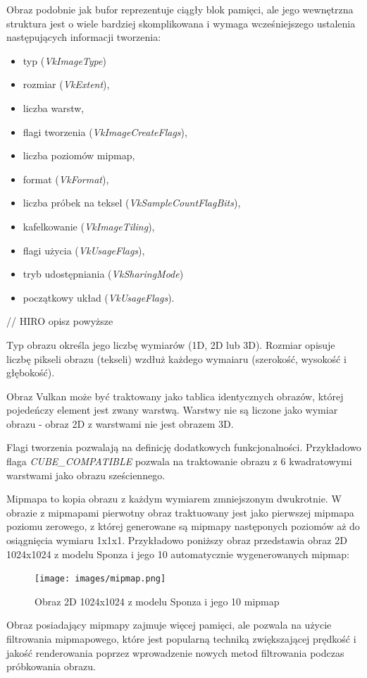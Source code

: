 Obraz podobnie jak bufor reprezentuje ciągły blok pamięci, ale jego wewnętrzna struktura jest o wiele bardziej skomplikowana i wymaga wcześniejszego ustalenia następujących informacji tworzenia:
\begin{itemize}
	\item typ (\textit{VkImageType})
	\item rozmiar (\textit{VkExtent}),
	\item liczba warstw,
	\item flagi tworzenia (\textit{VkImageCreateFlags}),
	\item liczba poziomów mipmap,
	\item format (\textit{VkFormat}),
	\item liczba próbek na teksel (\textit{VkSampleCountFlagBits}),
	\item kafelkowanie (\textit{VkImageTiling}),
	\item flagi użycia (\textit{VkUsageFlags}),
	\item tryb udostępniania (\textit{VkSharingMode})
	\item początkowy układ (\textit{VkUsageFlags}).
\end{itemize}

// HIRO opisz powyższe

Typ obrazu określa jego liczbę wymiarów (1D, 2D lub 3D).
Rozmiar opisuje liczbę pikseli obrazu (tekseli) wzdłuż każdego wymaiaru (szerokość, wysokość i głębokość).

Obraz Vulkan może być traktowany jako tablica identycznych obrazów, której pojedeńczy element jest zwany warstwą. Warstwy nie są liczone jako wymiar obrazu - obraz 2D z warstwami nie jest obrazem 3D.

Flagi tworzenia pozwalają na definicję dodatkowych funkcjonalności. Przykładowo flaga \textit{CUBE\_COMPATIBLE} pozwala na traktowanie obrazu z 6 kwadratowymi warstwami jako obrazu sześciennego.

Mipmapa to kopia obrazu z każdym wymiarem zmniejszonym dwukrotnie.
W obrazie z mipmapami pierwotny obraz traktuowany jest jako pierwszej mipmapa poziomu zerowego, z której generowane są mipmapy następonych poziomów aż do osiągnięcia wymiaru 1x1x1.
Przykładowo poniższy obraz przedstawia obraz 2D 1024x1024 z modelu Sponza \cite{GLTFSAMPLEMODELS} i jego 10 automatycznie wygenerowanych mipmap:
\begin{figure}[htbp]
	\centering
	\texttt{[image: images/mipmap.png]}
	\caption{Obraz 2D 1024x1024 z modelu Sponza \cite{GLTFSAMPLEMODELS} i jego 10 mipmap}
	\label{mipmap}
\end{figure}
Obraz posiadający mipmapy zajmuje więcej pamięci, ale pozwala na użycie filtrowania mipmapowego, które jest popularną techniką zwiększającej prędkość i jakość renderowania poprzez wprowadzenie nowych metod filtrowania podczas próbkowania obrazu.

